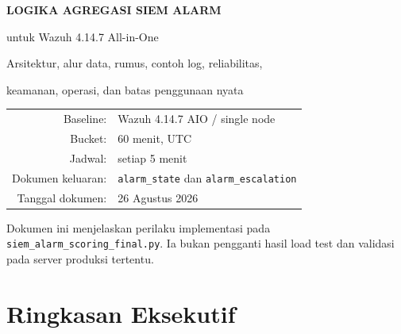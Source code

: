 \documentclass[11pt,a4paper,oneside]{report}
\DeclareRobustCommand{\code}[1]{\nolinkurl{#1}}
\newcommand{\projectfile}[1]{\texttt{#1}}
\begin{document}
\begin{titlepage}
  \centering
  \vspace*{15mm}
  {\sffamily\bfseries\color{WazuhBlue}\fontsize{30}{36}\selectfont
    LOGIKA AGREGASI SIEM ALARM\par}
  \vspace{5mm}
  {\sffamily\Large untuk Wazuh 4.14.7 All-in-One\par}
  \vspace{12mm}
  \vfill
  {\sffamily\large Arsitektur, alur data, rumus, contoh log, reliabilitas,\par
  keamanan, operasi, dan batas penggunaan nyata\par}
  \vfill
  \begin{tabular}{rl}
    Baseline: & Wazuh 4.14.7 AIO / single node\\
    Bucket: & 60 menit, UTC\\
    Jadwal: & setiap 5 menit\\
    Dokumen keluaran: & \code{alarm_state} dan \code{alarm_escalation}\\
    Tanggal dokumen: & 26 Agustus 2026\\
  \end{tabular}
  \vspace{15mm}

  {\small Dokumen ini menjelaskan perilaku implementasi pada
  \projectfile{siem\_alarm\_scoring\_final.py}. Ia bukan pengganti hasil
  load test dan validasi pada server produksi tertentu.}
\end{titlepage}

\tableofcontents
\clearpage
\listoffigures
\clearpage
\listoftables
\clearpage
{}

\chapter{Ringkasan Eksekutif}
\end{document}
